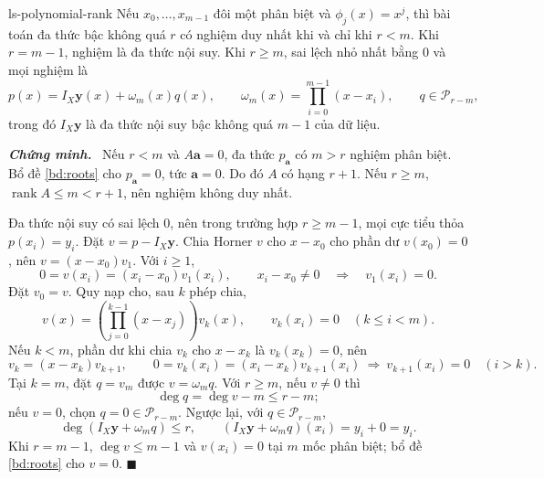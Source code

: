 \documentclass[12pt,a4paper,oneside]{book}
\numberwithin{algorithm}{chapter}
\theoremstyle{definition}
\newenvironment{chungminh}{\par\medskip\noindent\textbf{\textit{\color{mainblue}Chứng minh.}}\ }{\hfill$\blacksquare$\par\medskip}
\begin{document}
\begin{hequa}{}{ls-polynomial-rank}
Nếu $x_0,\ldots,x_{m-1}$ đôi một phân biệt và $\phi_j(x)=x^j$, thì bài toán đa thức bậc không quá $r$ có nghiệm duy nhất khi và chỉ khi $r<m$. Khi $r=m-1$, nghiệm là đa thức nội suy. Khi $r\geq m$, sai lệch nhỏ nhất bằng $0$ và mọi nghiệm là
\[
 p(x)=I_X\mathbf y(x)+\omega_m(x)q(x),\qquad
 \omega_m(x)=\prod_{i=0}^{m-1}(x-x_i),\qquad q\in\mathcal P_{r-m},
\]
trong đó $I_X\mathbf y$ là đa thức nội suy bậc không quá $m-1$ của dữ liệu.
\end{hequa}
\begin{chungminh}
Nếu $r<m$ và $A\mathbf a=0$, đa thức $p_{\mathbf a}$ có $m>r$ nghiệm phân biệt. Bổ đề \ref{bd:roots} cho $p_{\mathbf a}=0$, tức $\mathbf a=0$. Do đó $A$ có hạng $r+1$. Nếu $r\geq m$, $\operatorname{rank}A\leq m<r+1$, nên nghiệm không duy nhất.

Đa thức nội suy có sai lệch $0$, nên trong trường hợp $r\geq m-1$, mọi cực tiểu thỏa $p(x_i)=y_i$. Đặt $v=p-I_X\mathbf y$. Chia Horner $v$ cho $x-x_0$ cho phần dư $v(x_0)=0$, nên $v=(x-x_0)v_1$. Với $i\geq1$,
\[
 0=v(x_i)=(x_i-x_0)v_1(x_i),\qquad x_i-x_0\ne0\quad\Longrightarrow\quad v_1(x_i)=0.
\]
Đặt $v_0=v$. Quy nạp cho, sau $k$ phép chia,
\[
 v(x)=\left(\prod_{j=0}^{k-1}(x-x_j)\right)v_k(x),\qquad
 v_k(x_i)=0\quad(k\leq i<m).
\]
Nếu $k<m$, phần dư khi chia $v_k$ cho $x-x_k$ là $v_k(x_k)=0$, nên
\[
 v_k=(x-x_k)v_{k+1},\qquad
 0=v_k(x_i)=(x_i-x_k)v_{k+1}(x_i)
 \ \Longrightarrow\ v_{k+1}(x_i)=0\quad(i>k).
\]
Tại $k=m$, đặt $q=v_m$ được $v=\omega_mq$. Với $r\geq m$, nếu $v\ne0$ thì
\[
 \deg q=\deg v-m\leq r-m;
\]
nếu $v=0$, chọn $q=0\in\mathcal P_{r-m}$. Ngược lại, với $q\in\mathcal P_{r-m}$,
\[
 \deg(I_X\mathbf y+\omega_mq)\leq r,\qquad
 (I_X\mathbf y+\omega_mq)(x_i)=y_i+0=y_i.
\]
Khi $r=m-1$, $\deg v\leq m-1$ và $v(x_i)=0$ tại $m$ mốc phân biệt; bổ đề \ref{bd:roots} cho $v=0$.
\end{chungminh}
\end{document}
